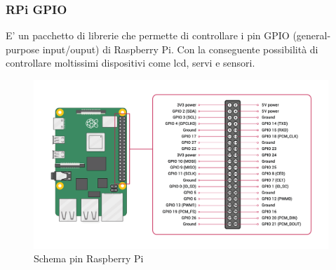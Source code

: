 \documentclass[a4paper,11pt]{report}
\begin{document}
\subsubsection{RPi GPIO}
E' un pacchetto di librerie che permette di controllare i pin GPIO (general-purpose input/ouput) di Raspberry Pi. Con la conseguente possibilità di controllare moltissimi dispositivi come lcd, servi e sensori.
\begin{figure}[H]
	\centering
	\includegraphics[width=0.99\textwidth]{figure/GPIO-Pinout-Diagram-2.png}
	\caption{Schema pin Raspberry Pi}
	\label{temp}
\end{figure}
\end{document}
